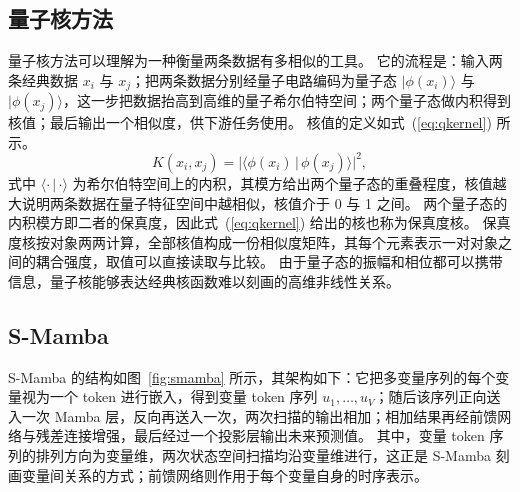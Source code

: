 \subsection{量子核方法}

量子核方法可以理解为一种衡量两条数据有多相似的工具。
它的流程是：输入两条经典数据 $x_i$ 与 $x_j$；把两条数据分别经量子电路编码为量子态 $|\phi(x_i)\rangle$ 与 $|\phi(x_j)\rangle$，这一步把数据抬高到高维的量子希尔伯特空间；两个量子态做内积得到核值；最后输出一个相似度，供下游任务使用。
核值的定义如式~(\ref{eq:qkernel}) 所示。
\begin{equation}
\label{eq:qkernel}
K(x_i,x_j) = |\langle \phi(x_i)\,|\,\phi(x_j)\rangle|^2,
\end{equation}
式中 $\langle\cdot\,|\,\cdot\rangle$ 为希尔伯特空间上的内积，其模方给出两个量子态的重叠程度，核值越大说明两条数据在量子特征空间中越相似，核值介于 0 与 1 之间。
两个量子态的内积模方即二者的保真度，因此式~(\ref{eq:qkernel}) 给出的核也称为保真度核。
保真度核按对象两两计算，全部核值构成一份相似度矩阵，其每个元素表示一对对象之间的耦合强度，取值可以直接读取与比较。
由于量子态的振幅和相位都可以携带信息，量子核能够表达经典核函数难以刻画的高维非线性关系。

\subsection{S-Mamba}

S-Mamba 的结构如图~\ref{fig:smamba} 所示，其架构如下\cite{wang2025smamba}：它把多变量序列的每个变量视为一个 token 进行嵌入，得到变量 token 序列 $u_1,\dots,u_V$；随后该序列正向送入一次 Mamba 层\cite{gu2024mamba}，反向再送入一次，两次扫描的输出相加；相加结果再经前馈网络与残差连接增强，最后经过一个投影层输出未来预测值。
其中，变量 token 序列的排列方向为变量维，两次状态空间扫描均沿变量维进行，这正是 S-Mamba 刻画变量间关系的方式；前馈网络则作用于每个变量自身的时序表示。

